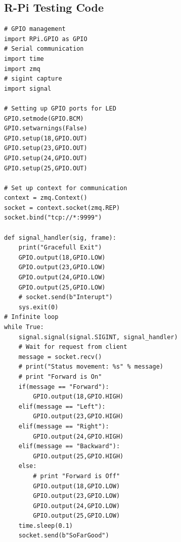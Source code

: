 \subsection{R-Pi Testing Code}
\begin{lstlisting}
# GPIO management
import RPi.GPIO as GPIO
# Serial communication
import time
import zmq
# sigint capture
import signal

# Setting up GPIO ports for LED
GPIO.setmode(GPIO.BCM)
GPIO.setwarnings(False)
GPIO.setup(18,GPIO.OUT)
GPIO.setup(23,GPIO.OUT)
GPIO.setup(24,GPIO.OUT)
GPIO.setup(25,GPIO.OUT)

# Set up context for communication
context = zmq.Context()
socket = context.socket(zmq.REP)
socket.bind("tcp://*:9999")

def signal_handler(sig, frame):
    print("Gracefull Exit")
    GPIO.output(18,GPIO.LOW)
    GPIO.output(23,GPIO.LOW)
    GPIO.output(24,GPIO.LOW)
    GPIO.output(25,GPIO.LOW)
    # socket.send(b"Interupt")
    sys.exit(0)
# Infinite loop
while True:
    signal.signal(signal.SIGINT, signal_handler)
    # Wait for request from client
    message = socket.recv()
    # print("Status movement: %s" % message)
    # print "Forward is On"
    if(message == "Forward"):
        GPIO.output(18,GPIO.HIGH)
    elif(message == "Left"):
        GPIO.output(23,GPIO.HIGH)
    elif(message == "Right"):
        GPIO.output(24,GPIO.HIGH)
    elif(message == "Backward"):
        GPIO.output(25,GPIO.HIGH)
    else:
        # print "Forward is Off"
        GPIO.output(18,GPIO.LOW)
        GPIO.output(23,GPIO.LOW)
        GPIO.output(24,GPIO.LOW)
        GPIO.output(25,GPIO.LOW)
    time.sleep(0.1)
    socket.send(b"SoFarGood")
\end{lstlisting}